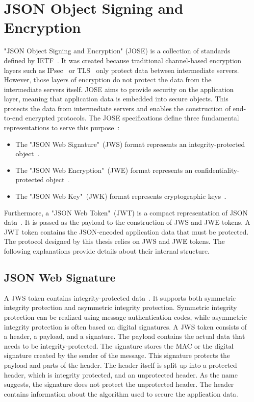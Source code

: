 \documentclass[../main.tex]{subfiles}
\begin{document}
\section{JSON Object Signing and Encryption}
\label{sec:jose}
"JSON Object Signing and Encryption" (JOSE) is a collection of standards defined by IETF~\cite{Barnes2014}.
It was created because traditional channel-based encryption layers such as IPsec~\cite{IPSEC2011} or TLS~\cite{TLS2018} only protect data between intermediate servers.
However, those layers of encryption do not protect the data from the intermediate servers itself.
JOSE aims to provide security on the application layer, meaning that application data is embedded into secure objects.
This protects the data from intermediate servers and enables the construction of end-to-end encrypted protocols.
The JOSE specifications define three fundamental representations to serve this purpose~\cite{Barnes2014}:
\begin{itemize}
    \item The "JSON Web Signature"~(JWS) format represents an integrity-protected object~\cite{JWS2015}.
    \item The "JSON Web Encryption"~(JWE) format represents an confidentiality-protected object~\cite{JWE2015}.
    \item The "JSON Web Key"~(JWK) format represents cryptographic keys~\cite{JWK2015}.
\end{itemize}
Furthermore, a "JSON Web Token"~(JWT) is a compact representation of JSON data~\cite{JWT2015}.
It is passed as the payload to the construction of JWS and JWE tokens.
A JWT token contains the JSON-encoded application data that must be protected.
The protocol designed by this thesis relies on JWS and JWE tokens.
The following explanations provide details about their internal structure.

\subsection{JSON Web Signature}
A JWS token contains integrity-protected data~\cite{JWS2015}.
It supports both symmetric integrity protection and asymmetric integrity protection.
Symmetric integrity protection can be realized using message authentication codes, while asymmetric integrity protection is often based on digital signatures.
A JWS token consists of a header, a payload, and a signature.
The payload contains the actual data that needs to be integrity-protected.
The signature stores the MAC or the digital signature created by the sender of the message.
This signature protects the payload and parts of the header.
The header itself is split up into a protected header, which is integrity protected, and an unprotected header.
As the name suggests, the signature does not protect the unprotected header.
The header contains information about the algorithm used to secure the application data.
\end{document}

